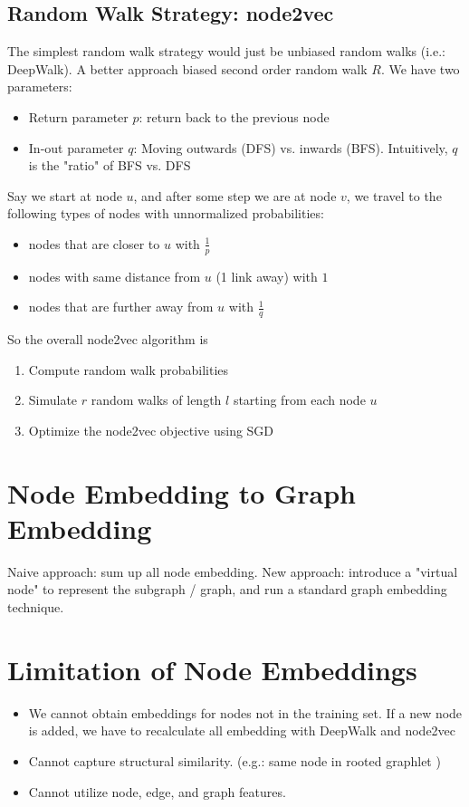 \subsection{Random Walk Strategy: node2vec}
The simplest random walk strategy would just be unbiased random walks (i.e.: DeepWalk). A better approach biased second order random walk $R$. We have two parameters: 
    \begin{itemize}
        \item Return parameter $p$: return back to the previous node 
        \item In-out parameter $q$: Moving outwards (DFS) vs. inwards (BFS). Intuitively, $q$ is the "ratio" of BFS vs. DFS
    \end{itemize}
Say we start at node $u$, and after some step we are at node $v$, we travel to the following types of nodes with unnormalized probabilities: 
    \begin{itemize}
        \item nodes that are closer to $u$ with $\frac{1}{p}$
        \item nodes with same distance from $u$ (1 link away) with $1$
        \item nodes that are further away from $u$ with  $\frac{1}{q}$
    \end{itemize}
So the overall node2vec algorithm is 
    \begin{enumerate}
        \item Compute random walk probabilities
        \item Simulate $r$ random walks of length $l$ starting from each node $u$
        \item Optimize the node2vec objective using SGD
    \end{enumerate} 
    
\section{Node Embedding to Graph Embedding} 
Naive approach: sum up all node embedding. New approach: introduce a "virtual node" to represent the subgraph / graph, and run a standard graph embedding technique. 


\section{Limitation of Node Embeddings}
    \begin{itemize}
        \item We cannot obtain embeddings for nodes not in the training set. If a new node is added, we have to recalculate all embedding with DeepWalk and node2vec
        \item Cannot capture structural similarity. (e.g.: same node in rooted graphlet )
        \item Cannot utilize node, edge, and graph features. 
    \end{itemize}